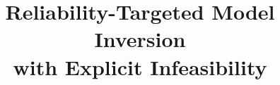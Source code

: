 \documentclass[conference]{IEEEtran}
\begin{document}
\title{Reliability-Targeted Model Inversion\\with Explicit Infeasibility}

\newif\ifanon
\anontrue                        %

\ifanon
  \author{
  }
\else
  \IfFileExists{authors.local.tex}{}{%
    \PackageError{aaiml2027}{authors.local.tex is missing}{%
      Camera-ready needs paper/authors.local.tex (gitignored, so it is not in
      a fresh clone). Recreate it with the \string\author{} block, or set
      \string\anontrue to build the anonymous version.}}
\fi

\maketitle
\end{document}

